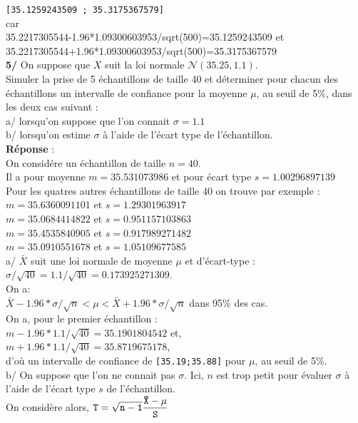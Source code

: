 \documentclass[a4paper,11pt]{book}
\begin{document}
{\tt [35.1259243509 ; 35.3175367579]}\\
car \\
35.2217305544-1.96*1.09300603953/sqrt(500)=35.1259243509 et\\
35.2217305544+1.96*1.09300603953/sqrt(500)=35.3175367579\\
{\bf 5/} On suppose que $X$ suit la loi normale $\mathcal N(35.25,1.1)$.\\
Simuler la prise de 5 \'echantillons de taille 40 et d\'eterminer pour chacun 
des \'echantillons un intervalle de 
confiance pour la moyenne $\mu$, au seuil de 5\%, dans les deux cas suivant :\\
a/ lorsqu'on suppose que l'on connait $\sigma=1.1$\\
b/ lorsqu'on estime $\sigma$ \`a l'aide de l'\'ecart type de l'\'echantillon.\\
{\bf R\'eponse} :\\
On consid\'ere un \'echantillon de taille $n=40$. \\
Il a pour moyenne $m=35.531073986$
et pour \'ecart type $s=1.00296897139$\\
Pour les quatres autres \'echantillons de taille $40$ on trouve par exemple :\\
$m=35.6360091101$ et $s=1.29301963917$\\
$m=35.0684414822$ et $s=0.951157103863$\\
$m=35.4535840905$ et $s=0.917989271482$\\
$m=35.0910551678$ et $s=1.05109677585$\\
a/ $\bar X$ suit une loi normale de moyenne $\mu$ et d'\'ecart-type :\\
$\sigma/\sqrt{40}=1.1/\sqrt{40}=0.173925271309$.\\
On a:\\ 
$\bar X-1.96*\sigma/\sqrt n<\mu<\bar X+1.96*\sigma/\sqrt n$ dans 95\% des cas.\\
On a, pour le premier \'echantillon :\\
$m-1.96*1.1/\sqrt{40}=35.1901804542$ et,\\
$m+1.96*1.1/\sqrt{40}=35.8719675178$,\\
d'o\`u un intervalle de confiance de {\tt [35.19;35.88]} pour $\mu$, au seuil 
de 5\%.\\
b/ On suppose que l'on ne connait pas $\sigma$. Ici, $n$ est trop petit pour 
\'evaluer $\sigma$ \`a l'aide de l'\'ecart type $s$ de l'\'echantillon.\\
On consid\`ere alors, ${\tt \displaystyle T=\sqrt{n-1}\frac{\bar X-\mu}{S}}$ 
\end{document}
